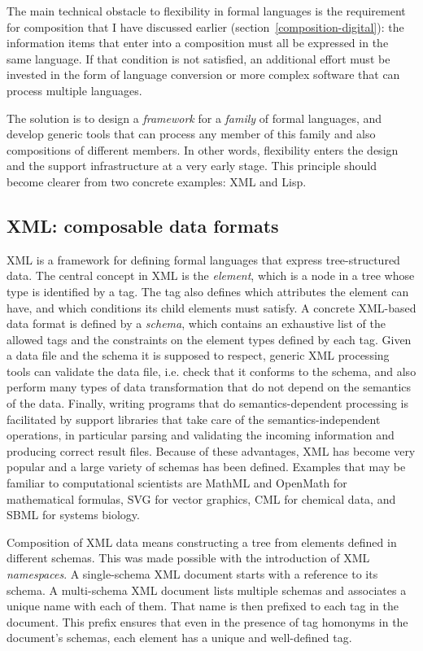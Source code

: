 The main technical obstacle to flexibility in formal languages is the requirement for composition that I have discussed earlier (section~\ref{composition-digital}): the information items that enter into a composition must all be expressed in the same language. If that condition is not satisfied, an additional effort must be invested in the form of language conversion or more complex software that can process multiple languages.

The solution is to design a \textit{framework} for a \textit{family} of formal languages, and develop generic tools that can process any member of this family and also compositions of different members. In other words, flexibility enters the design and the support infrastructure at a very early stage. This principle should become clearer from two concrete examples: XML and Lisp.

\subsection{XML: composable data formats}
\label{XML}

XML \cite{_extensible_1998} is a framework for defining formal languages that express tree-structured data. The central concept in XML is the \textit{element}, which is a node in a tree whose type is identified by a tag. The tag also defines which attributes the element can have, and which conditions its child elements must satisfy. A concrete XML-based data format is defined by a \textit{schema}, which contains an exhaustive list of the allowed tags and the constraints on the element types defined by each tag. Given a data file and the schema it is supposed to respect, generic XML processing tools can validate the data file, i.e. check that it conforms to the schema, and also perform many types of data transformation that do not depend on the semantics of the data. Finally, writing programs that do semantics-dependent processing is facilitated by support libraries that take care of the semantics-independent operations, in particular parsing and validating the incoming information and producing correct result files. Because of these advantages, XML has become very popular and a large variety of schemas has been defined. Examples that may be familiar to computational scientists are MathML and OpenMath for mathematical formulas, SVG for vector graphics, CML for chemical data, and SBML for systems biology.

Composition of XML data means constructing a tree from elements defined in different schemas. This was made possible with the introduction of XML \textit{namespaces}. A single-schema XML document starts with a reference to its schema. A multi-schema XML document lists multiple schemas and associates a unique name with each of them. That name is then prefixed to each tag in the document. This prefix ensures that even in the presence of tag homonyms in the document's schemas, each element has a unique and well-defined tag.

